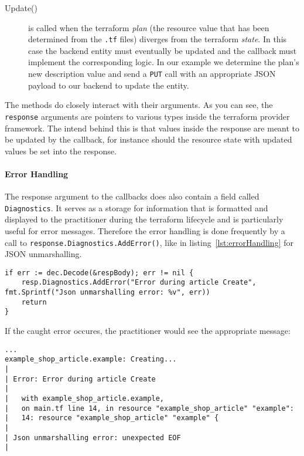 \documentclass[paper=a4,11pt,numbers=noenddot]{article}
\begin{document}
\begin{description}
  \item[Update()] is called when the terraform \emph{plan} (the resource value that has been determined from the \verb'.tf' files) diverges from the terraform \emph{state}. In this case the backend entity must eventually be updated and the callback must implement the corresponding logic. In our example we determine the plan's new description value and send a \verb'PUT' call with an appropriate JSON payload to our backend to update the entity.
\end{description}

The methods do closely interact with their arguments. As you can see, the \verb'response' arguments are pointers to various types inside the terraform provider framework. The intend behind this is that values inside the response are meant to be updated by the callback, for instance should the resource state with updated values be set into the response.

\paragraph{Error Handling}

The response argument to the callbacks does also contain a field called \verb'Diagnostics'. It serves as a storage for information that is formatted and displayed to the practitioner during the terraform lifecycle and is particularly useful for error messages. Therefore the error handling is done frequently by a call to \verb'response.Diagnostics.AddError()', like in listing~\ref{lst:errorHandling} for JSON unmarshalling.

\begin{lstlisting}[label=lst:errorHandling]
if err := dec.Decode(&respBody); err != nil {
    resp.Diagnostics.AddError("Error during article Create", fmt.Sprintf("Json unmarshalling error: %v", err))
    return
}
\end{lstlisting}

If the caught error occures, the practitioner would see the appropriate message:

\begin{lstlisting}
...
example_shop_article.example: Creating...
|
| Error: Error during article Create
|
|   with example_shop_article.example,
|   on main.tf line 14, in resource "example_shop_article" "example":
|   14: resource "example_shop_article" "example" {
|
| Json unmarshalling error: unexpected EOF
|
\end{lstlisting}
\end{document}

